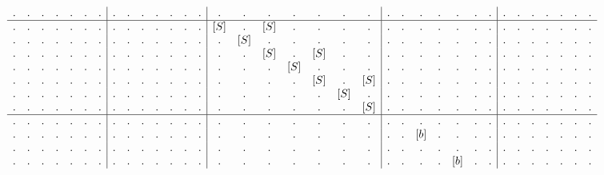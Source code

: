 \begin{example}
\begin{align}
\begin{array}{c c c c c c c | c c c c c c c | c c c c c c c | c c c c c c c | c c c c c c c}
. & . & . & . & . & . & .   &   . & .   & . & .   & . & .   & .   &   . & .           & . & .           & . & .           & .  &  . & . & .            & . & .            & . & .             &  . & . & .             & . & .             & . & .               \\
\hline                                                                                
. & . & . & . & . & . & .   &   . & . & . & . & . & . & .   &   [S] & .   & [S] & .   & .   & .   & .    &  . & . & . & . & . & . & .  &  . & . & . & . & . & . & .   \\
. & . & . & . & . & . & .   &   . & . & . & . & . & . & .   &   .   & [S] & .   & .   & .   & .   & .    &  . & . & . & . & . & . & .  &  . & . & . & . & . & . & .   \\
. & . & . & . & . & . & .   &   . & . & . & . & . & . & .   &   .   & .   & [S] & .   & [S] & .   & .    &  . & . & . & . & . & . & .  &  . & . & . & . & . & . & .   \\
. & . & . & . & . & . & .   &   . & . & . & . & . & . & .   &   .   & .   & .   & [S] & .   & .   & .    &  . & . & . & . & . & . & .  &  . & . & . & . & . & . & .   \\
. & . & . & . & . & . & .   &   . & . & . & . & . & . & .   &   .   & .   & .   & .   & [S] & .   & [S]  &  . & . & . & . & . & . & .  &  . & . & . & . & . & . & .   \\
. & . & . & . & . & . & .   &   . & . & . & . & . & . & .   &   .   & .   & .   & .   & .   & [S] & .    &  . & . & . & . & . & . & .  &  . & . & . & . & . & . & .   \\
. & . & . & . & . & . & .   &   . & . & . & . & . & . & .   &   .   & .   & .   & .   & .   & .   & [S]  &  . & . & . & . & . & . & .  &  . & . & . & . & . & . & .   \\
\hline                                                                                
. & . & . & . & . & . & .  &  . & . & . & . & . & . & .  &  . & . & . & . & . & . & .  &  . & . & .   & . & .   & . & .    &  . & . & . & . & . & . & .   \\
. & . & . & . & . & . & .  &  . & . & . & . & . & . & .  &  . & . & . & . & . & . & .  &  . & . & [b] & . & .   & . & .    &  . & . & . & . & . & . & .   \\
. & . & . & . & . & . & .  &  . & . & . & . & . & . & .  &  . & . & . & . & . & . & .  &  . & . & .   & . & .   & . & .    &  . & . & . & . & . & . & .   \\
. & . & . & . & . & . & .  &  . & . & . & . & . & . & .  &  . & . & . & . & . & . & .  &  . & . & .   & . & [b] & . & .    &  . & . & . & . & . & . & .   \\

\end{array}
\end{align}
\end{example}
